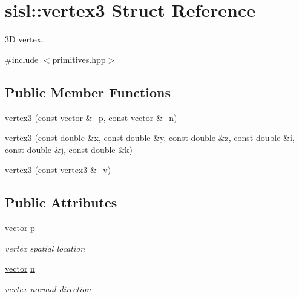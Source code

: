 \hypertarget{structsisl_1_1vertex3}{}\section{sisl\+:\+:vertex3 Struct Reference}
\label{structsisl_1_1vertex3}


3D vertex.  




{\ttfamily \#include $<$primitives.\+hpp$>$}

\subsection*{Public Member Functions}
\begin{DoxyCompactItemize}
\item 
\hyperlink{structsisl_1_1vertex3_ab40c72beb889e4cca21d372eff7886ef}{vertex3} (const \hyperlink{namespacesisl_a2069bd5374a9be042ff3ce3306d41e1a}{vector} \&\+\_\+p, const \hyperlink{namespacesisl_a2069bd5374a9be042ff3ce3306d41e1a}{vector} \&\+\_\+n)
\item 
\hyperlink{structsisl_1_1vertex3_a9ced36fc7fbadbb1a9fd285529417f28}{vertex3} (const double \&x, const double \&y, const double \&z, const double \&i, const double \&j, const double \&k)
\item 
\hyperlink{structsisl_1_1vertex3_a689f16f717542968ed5ba74129866228}{vertex3} (const \hyperlink{structsisl_1_1vertex3}{vertex3} \&\+\_\+v)
\end{DoxyCompactItemize}
\subsection*{Public Attributes}
\begin{DoxyCompactItemize}
\item 
\mbox{\label{structsisl_1_1vertex3_aa67a470e2653f995cc2f20da7551e80a}} 
\hyperlink{namespacesisl_a2069bd5374a9be042ff3ce3306d41e1a}{vector} \hyperlink{structsisl_1_1vertex3_aa67a470e2653f995cc2f20da7551e80a}{p}
\begin{DoxyCompactList}\small\item\em vertex spatial location \end{DoxyCompactList}\item 
\mbox{\label{structsisl_1_1vertex3_a04353827513fa8173bf690d77004a143}} 
\hyperlink{namespacesisl_a2069bd5374a9be042ff3ce3306d41e1a}{vector} \hyperlink{structsisl_1_1vertex3_a04353827513fa8173bf690d77004a143}{n}
\begin{DoxyCompactList}\small\item\em vertex normal direction \end{DoxyCompactList}\end{DoxyCompactItemize}


